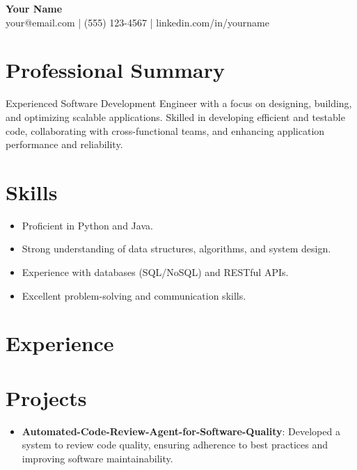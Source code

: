 \documentclass[11pt,a4paper]{article}
\begin{document}
\begin{center}
{\LARGE \textbf{Your Name}} \\[4pt]
your@email.com \quad | \quad (555) 123-4567 \quad | \quad linkedin.com/in/yourname
\end{center}

\vspace{8pt}

\section*{Professional Summary}
Experienced Software Development Engineer with a focus on designing, building, and optimizing scalable applications. Skilled in developing efficient and testable code, collaborating with cross-functional teams, and enhancing application performance and reliability.

\section*{Skills}
\begin{itemize} \item Proficient in Python and Java. \item Strong understanding of data structures, algorithms, and system design. \item Experience with databases (SQL/NoSQL) and RESTful APIs. \item Excellent problem-solving and communication skills. \end{itemize}

\section*{Experience}

\section*{Projects}
\begin{itemize} \item \textbf{Automated-Code-Review-Agent-for-Software-Quality}: Developed a system to review code quality, ensuring adherence to best practices and improving software maintainability. \end{itemize}
\end{document}
